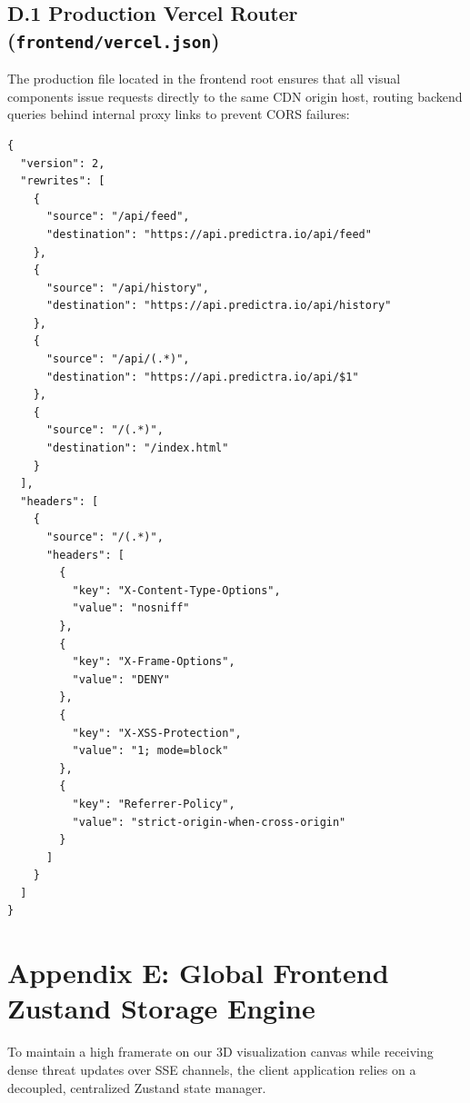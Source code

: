 \subsection*{D.1 Production Vercel Router (\texttt{frontend/vercel.json})}
The production file located in the frontend root ensures that all visual components issue requests directly to the same CDN origin host, routing backend queries behind internal proxy links to prevent CORS failures:
\begin{verbatim}
{
  "version": 2,
  "rewrites": [
    {
      "source": "/api/feed",
      "destination": "https://api.predictra.io/api/feed"
    },
    {
      "source": "/api/history",
      "destination": "https://api.predictra.io/api/history"
    },
    {
      "source": "/api/(.*)",
      "destination": "https://api.predictra.io/api/$1"
    },
    {
      "source": "/(.*)",
      "destination": "/index.html"
    }
  ],
  "headers": [
    {
      "source": "/(.*)",
      "headers": [
        {
          "key": "X-Content-Type-Options",
          "value": "nosniff"
        },
        {
          "key": "X-Frame-Options",
          "value": "DENY"
        },
        {
          "key": "X-XSS-Protection",
          "value": "1; mode=block"
        },
        {
          "key": "Referrer-Policy",
          "value": "strict-origin-when-cross-origin"
        }
      ]
    }
  ]
}
\end{verbatim}

\section*{Appendix E: Global Frontend Zustand Storage Engine}
To maintain a high framerate on our 3D visualization canvas while receiving dense threat updates over SSE channels, the client application relies on a decoupled, centralized Zustand state manager.

